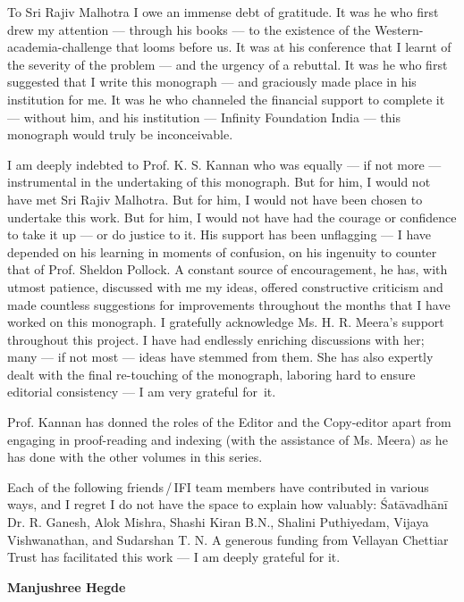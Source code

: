 To Sri Rajiv Malhotra I owe an immense debt of gratitude. It was he who first drew my attention --- through his books --- to the existence of the Western-academia-challenge that looms before us. It was at his conference that I learnt of the severity of the problem --- and the urgency of a rebuttal. It was he who first suggested that I write this monograph --- and graciously made place in his institution for me. It was he who channeled the financial support to complete it --- without him, and his institution --- Infinity Foundation India --- this monograph would truly be inconceivable.   

I am deeply indebted to Prof. K. S. Kannan who was equally --- if not more --- instrumental in the undertaking of this monograph. But for him, I would not have met Sri Rajiv Malhotra. But for him, I would not have been chosen to undertake this work. But for him, I would not have had the courage or confidence to take it up --- or do justice to it. His support has been unflagging --- I have depended on his learning in moments of confusion, on his ingenuity to counter that of Prof. Sheldon Pollock. A constant source of encouragement, he has, with utmost patience, discussed with me my ideas, offered constructive criticism and made countless suggestions for improvements throughout the months that I have worked on this monograph.  I gratefully acknowledge Ms. H. R. Meera’s support throughout this project. I have had endlessly enriching discussions with her; many --- if not most --- ideas have stemmed from them.  She has also expertly dealt with the final re-touching of the monograph, laboring hard to ensure editorial consistency --- I am very grateful for~it.

Prof. Kannan has donned the roles of the Editor and the Copy-editor apart from engaging in proof-reading and indexing (with the assistance of Ms. Meera) as he has done with the other volumes in this series. 

Each of the following friends\,/\,IFI team members have contributed in various ways, and I regret I do not have the space to explain how valuably: Śatāvadhānī Dr. R. Ganesh, Alok Mishra, Shashi Kiran B.N., Shalini Puthiyedam, Vijaya Vishwanathan, and Sudarshan T. N. A generous funding from Vellayan Chettiar Trust has facilitated this work --- I am deeply grateful for it. 


\bigskip
\hfill {\bf Manjushree Hegde}


